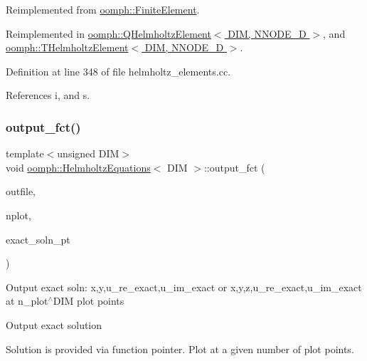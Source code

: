 Reimplemented from \hyperlink{classoomph_1_1FiniteElement_adfaee690bb0608f03320eeb9d110d48c}{oomph\+::\+Finite\+Element}.



Reimplemented in \hyperlink{classoomph_1_1QHelmholtzElement_a235f2ddc4141b070590e8e19f1924b21}{oomph\+::\+Q\+Helmholtz\+Element$<$ D\+I\+M, N\+N\+O\+D\+E\+\_\+D $>$}, and \hyperlink{classoomph_1_1THelmholtzElement_a156cee7b91f59f380139ce6551468b2c}{oomph\+::\+T\+Helmholtz\+Element$<$ D\+I\+M, N\+N\+O\+D\+E\+\_\+D $>$}.



Definition at line 348 of file helmholtz\+\_\+elements.\+cc.



References i, and s.

\mbox{\label{classoomph_1_1HelmholtzEquations_a18bda8e96ef3abc2d247018592f15f56}} 
\subsubsection{\texorpdfstring{output\+\_\+fct()}{output\_fct()}\hspace{0.1cm}{\footnotesize\ttfamily [1/2]}}
{\footnotesize\ttfamily template$<$unsigned D\+IM$>$ \\
void \hyperlink{classoomph_1_1HelmholtzEquations}{oomph\+::\+Helmholtz\+Equations}$<$ D\+IM $>$\+::output\+\_\+fct (\begin{DoxyParamCaption}\item[{std\+::ostream \&}]{outfile,  }\item[{const unsigned \&}]{nplot,  }\item[{\hyperlink{classoomph_1_1FiniteElement_a690fd33af26cc3e84f39bba6d5a85202}{Finite\+Element\+::\+Steady\+Exact\+Solution\+Fct\+Pt}}]{exact\+\_\+soln\+\_\+pt }\end{DoxyParamCaption})\hspace{0.3cm}{\ttfamily [virtual]}}

Output exact soln\+: x,y,u\+\_\+re\+\_\+exact,u\+\_\+im\+\_\+exact or x,y,z,u\+\_\+re\+\_\+exact,u\+\_\+im\+\_\+exact at n\+\_\+plot$^\wedge$\+D\+IM plot points

Output exact solution

Solution is provided via function pointer. Plot at a given number of plot points.

